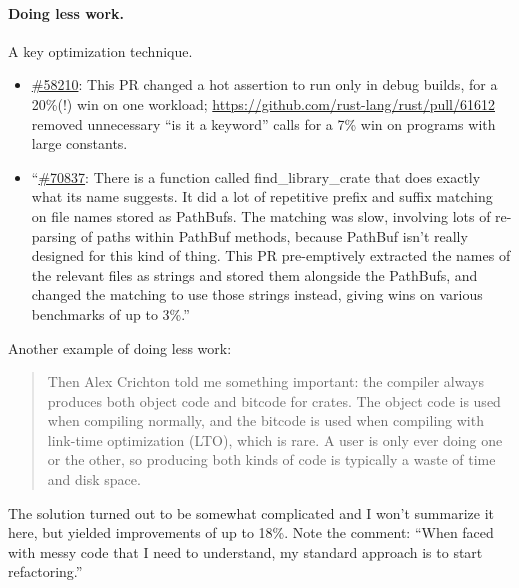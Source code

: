 \documentclass[a4paper]{report}
\begin{document}
\paragraph{Doing less work.} A key optimization technique.
\begin{itemize}[noitemsep]
\item {} \href{https://github.com/rust-lang/rust/pull/58210}{\#58210}: This PR changed a hot assertion to run only in debug builds, for a 20\%(!) win on one workload; \url{https://github.com/rust-lang/rust/pull/61612} removed unnecessary ``is it a keyword'' calls for a 7\% win on programs with large constants.
\item {} ``\href{https://github.com/rust-lang/rust/pull/70837}{\#70837}: There is a function called find\_library\_crate that does exactly what its name suggests. It did a lot of repetitive prefix and suffix matching on file names stored as PathBufs. The matching was slow, involving lots of re-parsing of paths within PathBuf methods, because PathBuf isn't really designed for this kind of thing. This PR pre-emptively extracted the names of the relevant files as strings and stored them alongside the PathBufs, and changed the matching to use those strings instead, giving wins on various benchmarks of up to 3\%.''
\end{itemize}

Another example of doing less work:
\begin{quote}
Then Alex Crichton told me something important: the compiler always produces both object code and bitcode for crates. The object code is used when compiling normally, and the bitcode is used when compiling with link-time optimization (LTO), which is rare. A user is only ever doing one or the other, so producing both kinds of code is typically a waste of time and disk space.
\end{quote}
The solution turned out to be somewhat complicated and I won't summarize it here, but yielded improvements of up to 18\%. Note the comment: ``When faced with messy code that I need to understand, my standard approach is to start refactoring.''
\end{document}
